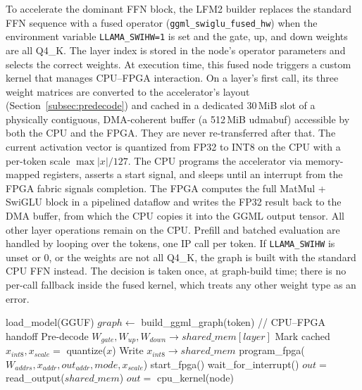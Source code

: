 To accelerate the dominant FFN block, the LFM2 builder replaces the standard FFN
sequence with a fused operator (\texttt{ggml\_swiglu\_fused\_hw}) when the environment
variable \texttt{LLAMA\_SWIHW=1} is set and the gate, up, and down weights are all
Q4\_K. The layer index is stored in the node's operator parameters and selects the
correct weights. At
execution time, this fused node triggers a custom kernel that manages CPU--FPGA
interaction. On a layer's first call, its three weight matrices are converted to the
accelerator's layout (Section~\ref{subsec:predecode}) and cached in a dedicated
30\,MiB slot of a physically contiguous, DMA-coherent buffer (a 512\,MiB udmabuf)
accessible by both the CPU and the FPGA. They are never re-transferred after that. The
current activation vector is quantized from FP32 to INT8 on the CPU with a per-token
scale $\max|x|/127$. The CPU programs the accelerator via memory-mapped registers,
asserts a start signal, and sleeps until an interrupt from the FPGA fabric signals
completion. The FPGA computes the full MatMul + SwiGLU block in a pipelined dataflow
and writes the FP32 result back to the DMA buffer, from which the CPU copies it into
the GGML output tensor. All other layer operations remain on the CPU. Prefill and
batched evaluation are handled by looping over the tokens, one IP call per token. If
\texttt{LLAMA\_SWIHW} is unset or 0, or the weights are not all Q4\_K, the graph is
built with the standard CPU FFN instead. The decision is taken once, at graph-build
time; there is no per-call fallback inside the fused kernel, which treats any other
weight type as an error.

\begin{algorithm}[htb!]
\caption{LFM2.5 Inference Execution}
\label{alg:inference}
\begin{algorithmic}[1]
\STATE load\_model(GGUF)
    \STATE $graph \leftarrow$ build\_ggml\_graph(token)
            \STATE // CPU--FPGA handoff
                \STATE Pre-decode $W_{gate}, W_{up}, W_{down} \rightarrow shared\_mem[layer]$
                \STATE Mark cached
            \ENDIF
            \STATE $x_{int8}, x_{scale} =$ quantize($x$)
            \STATE Write $x_{int8} \rightarrow shared\_mem$
            \STATE program\_fpga($W_{addrs}, x_{addr}, out_{addr}, mode, x_{scale}$) 
            \STATE start\_fpga()
            \STATE wait\_for\_interrupt()
            \STATE $out =$ read\_output($shared\_mem$)
        \ELSE
            \STATE $out =$ cpu\_kernel(node)
        \ENDIF
    \ENDFOR
    \STATE {}
\ENDFOR
\end{algorithmic}
\end{algorithm}

